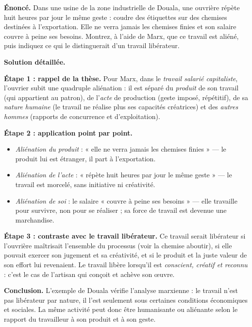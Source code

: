 \documentclass[11pt]{article}
\newcommand{\cle}[1]{{\popxbold\color{popdark}#1}}
\begin{document}
\begin{exoresolu}
\textbf{Énoncé.} Dans une usine de la zone industrielle de Douala, une ouvrière répète huit heures par jour le même geste : coudre des étiquettes sur des chemises destinées à l'exportation. Elle ne verra jamais les chemises finies et son salaire couvre à peine ses besoins. Montrez, à l'aide de Marx, que ce travail est aliéné, puis indiquez ce qui le distinguerait d'un travail libérateur.

\tcblower
\textbf{Solution détaillée.}

\textbf{Étape 1 : rappel de la thèse.} Pour Marx, dans le \emph{travail salarié capitaliste}, l'ouvrier subit une quadruple \cle{aliénation} : il est séparé du \emph{produit} de son travail (qui appartient au patron), de l'\emph{acte} de production (geste imposé, répétitif), de sa \emph{nature humaine} (le travail ne réalise plus ses capacités créatrices) et des \emph{autres hommes} (rapports de concurrence et d'exploitation).

\textbf{Étape 2 : application point par point.}
\begin{itemize}
\item \emph{Aliénation du produit} : « elle ne verra jamais les chemises finies » — le produit lui est étranger, il part à l'exportation.
\item \emph{Aliénation de l'acte} : « répète huit heures par jour le même geste » — le travail est morcelé, sans initiative ni créativité.
\item \emph{Aliénation de soi} : le salaire « couvre à peine ses besoins » — elle travaille pour survivre, non pour se réaliser ; sa force de travail est devenue une marchandise.
\end{itemize}

\textbf{Étape 3 : contraste avec le travail libérateur.} Ce travail serait libérateur si l'ouvrière maîtrisait l'ensemble du processus (voir la chemise aboutir), si elle pouvait exercer son jugement et sa créativité, et si le produit et la juste valeur de son effort lui revenaient. Le travail libère lorsqu'il est \emph{conscient, créatif et reconnu} : c'est le cas de l'artisan qui conçoit et achève son œuvre.

\textbf{Conclusion.} L'exemple de Douala vérifie l'analyse marxienne : le travail n'est pas libérateur par nature, il l'est seulement sous certaines conditions économiques et sociales. La même activité peut donc être humanisante ou aliénante selon le rapport du travailleur à son produit et à son geste.
\end{exoresolu}
\end{document}
